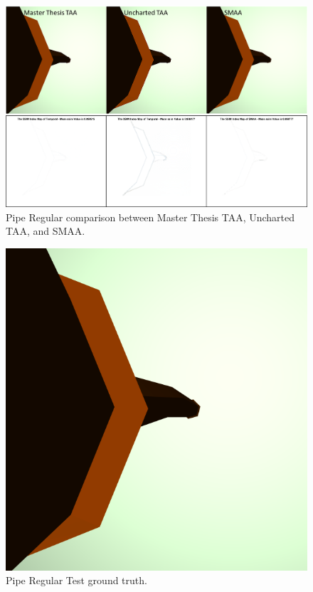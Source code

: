\documentclass[pregrado]{tesis-usb} %
\begin{document}
\begin{figure}[H]
	\centering
	\includegraphics[scale=0.5]{images/results/pipe_regular.png}
	\caption{Pipe Regular comparison between Master Thesis TAA, Uncharted TAA, and SMAA.}\label{fig:pipe_regular_render}
\end{figure}

\begin{figure}[H]
	\centering
	\includegraphics[scale=0.2]{images/results/pipe_regular_sobel_ground_truth.png}
	\caption{Pipe Regular Test ground truth.}\label{fig:pipe_regular_truth}
\end{figure}
\end{document}
